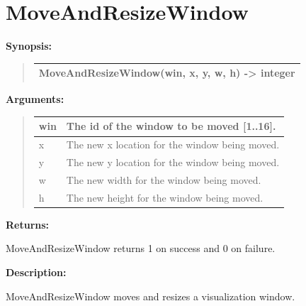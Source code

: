 \documentclass[letterpaper,10pt,english]{sphinxmanual}
\begin{document}
\section{MoveAndResizeWindow}
\label{functions:moveandresizewindow}
\begin{DUlineblock}{0em}
\item[] \textbf{Synopsis:}
\end{DUlineblock}
\begin{quote}

\begin{tabulary}{\linewidth}{|L|}
\hline

MoveAndResizeWindow(win, x, y, w, h) -\textgreater{} integer
\\
\hline\end{tabulary}

\end{quote}

\begin{DUlineblock}{0em}
\item[] 
\item[] \textbf{Arguments:}
\end{DUlineblock}
\begin{quote}

\begin{tabulary}{\linewidth}{|L|L|}
\hline

win
 & 
The id of the window to be moved {[}1..16{]}.
\\
\hline
x
 & 
The new x location for the window being moved.
\\
\hline
y
 & 
The new y location for the window being moved.
\\
\hline
w
 & 
The new width for the window being moved.
\\
\hline
h
 & 
The new height for the window being moved.
\\
\hline\end{tabulary}

\end{quote}

\begin{DUlineblock}{0em}
\item[] 
\item[] \textbf{Returns:}
\item[] MoveAndResizeWindow returns 1 on success and 0 on failure.
\item[] 
\item[] \textbf{Description:}
\item[] MoveAndResizeWindow moves and resizes a visualization window.
\end{DUlineblock}
\end{document}

